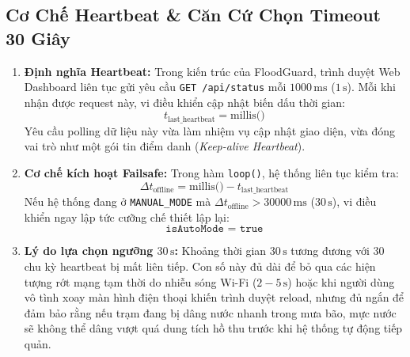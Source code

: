 \subsection{Cơ Chế Heartbeat \& Căn Cứ Chọn Timeout 30 Giây}
\begin{enumerate}
    \item \textbf{Định nghĩa Heartbeat:} Trong kiến trúc của FloodGuard, trình duyệt Web Dashboard liên tục gửi yêu cầu \texttt{GET /api/status} mỗi $1000\,\text{ms}$ ($1\,\text{s}$). Mỗi khi nhận được request này, vi điều khiển cập nhật biến dấu thời gian:
    \begin{equation}
        t_{\text{last\_heartbeat}} = \text{millis()}
    \end{equation}
    Yêu cầu polling dữ liệu này vừa làm nhiệm vụ cập nhật giao diện, vừa đóng vai trò như một gói tin điểm danh (\textit{Keep-alive Heartbeat}).
    \item \textbf{Cơ chế kích hoạt Failsafe:} Trong hàm \texttt{loop()}, hệ thống liên tục kiểm tra:
    \begin{equation}
        \Delta t_{\text{offline}} = \text{millis()} - t_{\text{last\_heartbeat}}
    \end{equation}
    Nếu hệ thống đang ở \texttt{MANUAL\_MODE} mà $\Delta t_{\text{offline}} > 30000\,\text{ms}$ ($30\,\text{s}$), vi điều khiển ngay lập tức cưỡng chế thiết lập lại:
    \begin{equation}
        \texttt{isAutoMode = true}
    \end{equation}
    \item \textbf{Lý do lựa chọn ngưỡng $30\,\text{s}$:} 
    Khoảng thời gian $30\,\text{s}$ tương đương với 30 chu kỳ heartbeat bị mất liên tiếp. Con số này đủ dài để bỏ qua các hiện tượng rớt mạng tạm thời do nhiễu sóng Wi-Fi ($2 - 5\,\text{s}$) hoặc khi người dùng vô tình xoay màn hình điện thoại khiến trình duyệt reload, nhưng đủ ngắn để đảm bảo rằng nếu trạm đang bị dâng nước nhanh trong mưa bão, mực nước sẽ không thể dâng vượt quá dung tích hồ thu trước khi hệ thống tự động tiếp quản.
\end{enumerate}

